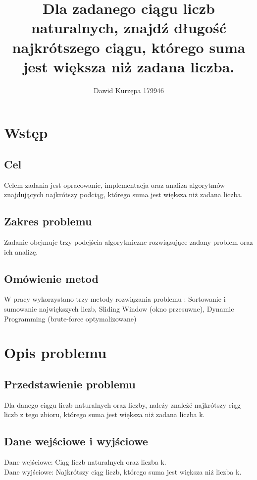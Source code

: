 \documentclass[12pt,twoside]{article}
\author{Dawid Kurzępa 179946}
\title{Dla zadanego ciągu liczb naturalnych, znajdź długość
najkrótszego ciągu, którego suma jest większa niż zadana
liczba. }
\begin{document}
\maketitle

\blankpage

\tableofcontents

\clearpage
\blankpage


\section{Wstęp}

\subsection{Cel}
Celem zadania jest opracowanie, implementacja oraz analiza algorytmów znajdujących najkrótszy podciąg, którego suma jest większa niż zadana liczba.

\subsection{Zakres problemu}
Zadanie obejmuje trzy podejścia algorytmiczne rozwiązujące zadany problem oraz ich analizę.

\subsection{Omówienie metod}
W pracy wykorzystano trzy metody rozwiązania problemu :
Sortowanie i sumowanie największych liczb,
Sliding Window (okno przesuwne),
Dynamic Programming (brute-force optymalizowane)

\section{Opis problemu}

\subsection{Przedstawienie problemu}
Dla danego ciągu liczb naturalnych oraz liczby, należy znaleźć najkrótszy ciąg liczb z tego zbioru, którego suma jest większa niż zadana liczba k.

\subsection{Dane wejściowe i wyjściowe}
Dane wejściowe: Ciąg liczb naturalnych oraz liczba k.\\
Dane wyjściowe: Najkrótszy ciąg liczb, którego suma jest większa niż liczba k.
\end{document}
